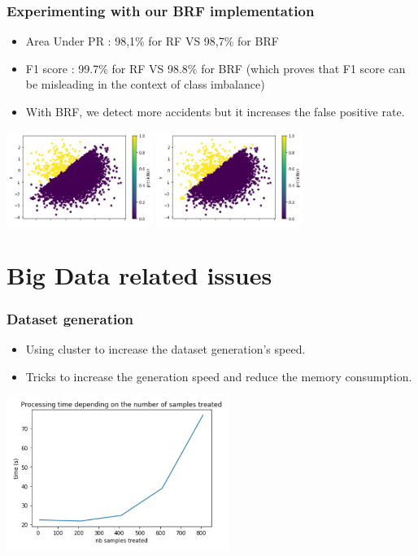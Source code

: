\documentclass[slidestop,compress,red,mathserif]{beamer}
\begin{document}
\begin{frame}
\frametitle{Experimenting with our BRF implementation}
\begin{itemize}
  \item Area Under PR : 98,1\% for RF VS 98,7\% for BRF
  \item F1 score : 99.7\% for RF VS 98.8\% for BRF (which proves that F1 score can be misleading in the context of class imbalance)
  \item With BRF, we detect more accidents but it increases the false positive rate.

\end{itemize}

\centering
\includegraphics[height=3.0cm, keepaspectratio]{Figures/RF.png}
\includegraphics[height=3.0cm, keepaspectratio]{Figures/BRF.png}

\end{frame}

\section{Big Data related issues}

\begin{frame}
	\frametitle{Dataset generation}
	\begin{itemize}
		\item Using cluster to increase the dataset generation's speed.
    \item Tricks to increase the generation speed and reduce the memory consumption.
	\end{itemize}
\centering
\includegraphics[height=5.0cm, keepaspectratio]{Figures/timeVSsamples_generatepositivesamples.png}
\end{frame}
\end{document}
